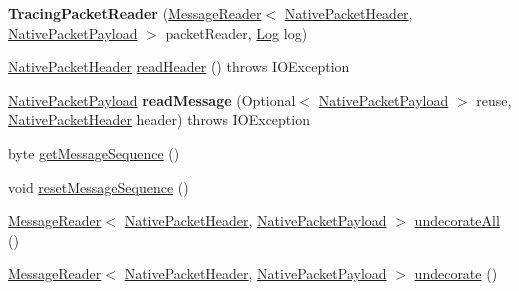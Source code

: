 \begin{DoxyCompactItemize}
\item 
\mbox{\label{classcom_1_1mysql_1_1cj_1_1protocol_1_1a_1_1_tracing_packet_reader_a5a10a043137ff4dd4c39577d98013861}} 
{\bfseries Tracing\+Packet\+Reader} (\mbox{\hyperlink{interfacecom_1_1mysql_1_1cj_1_1protocol_1_1_message_reader}{Message\+Reader}}$<$ \mbox{\hyperlink{classcom_1_1mysql_1_1cj_1_1protocol_1_1a_1_1_native_packet_header}{Native\+Packet\+Header}}, \mbox{\hyperlink{classcom_1_1mysql_1_1cj_1_1protocol_1_1a_1_1_native_packet_payload}{Native\+Packet\+Payload}} $>$ packet\+Reader, \mbox{\hyperlink{interfacecom_1_1mysql_1_1cj_1_1log_1_1_log}{Log}} log)
\item 
\mbox{\hyperlink{classcom_1_1mysql_1_1cj_1_1protocol_1_1a_1_1_native_packet_header}{Native\+Packet\+Header}} \mbox{\hyperlink{classcom_1_1mysql_1_1cj_1_1protocol_1_1a_1_1_tracing_packet_reader_a67550eb953a1d19c2ea8663e2336e2a3}{read\+Header}} ()  throws I\+O\+Exception 
\item 
\mbox{\label{classcom_1_1mysql_1_1cj_1_1protocol_1_1a_1_1_tracing_packet_reader_aff5267e4134fe6e81a0122eb5e2d2455}} 
\mbox{\hyperlink{classcom_1_1mysql_1_1cj_1_1protocol_1_1a_1_1_native_packet_payload}{Native\+Packet\+Payload}} {\bfseries read\+Message} (Optional$<$ \mbox{\hyperlink{classcom_1_1mysql_1_1cj_1_1protocol_1_1a_1_1_native_packet_payload}{Native\+Packet\+Payload}} $>$ reuse, \mbox{\hyperlink{classcom_1_1mysql_1_1cj_1_1protocol_1_1a_1_1_native_packet_header}{Native\+Packet\+Header}} header)  throws I\+O\+Exception 
\item 
byte \mbox{\hyperlink{classcom_1_1mysql_1_1cj_1_1protocol_1_1a_1_1_tracing_packet_reader_a35edadc0834493cc9536aa1c624c13ac}{get\+Message\+Sequence}} ()
\item 
void \mbox{\hyperlink{classcom_1_1mysql_1_1cj_1_1protocol_1_1a_1_1_tracing_packet_reader_a750a22688863ef18d02baaccd7f8475d}{reset\+Message\+Sequence}} ()
\item 
\mbox{\hyperlink{interfacecom_1_1mysql_1_1cj_1_1protocol_1_1_message_reader}{Message\+Reader}}$<$ \mbox{\hyperlink{classcom_1_1mysql_1_1cj_1_1protocol_1_1a_1_1_native_packet_header}{Native\+Packet\+Header}}, \mbox{\hyperlink{classcom_1_1mysql_1_1cj_1_1protocol_1_1a_1_1_native_packet_payload}{Native\+Packet\+Payload}} $>$ \mbox{\hyperlink{classcom_1_1mysql_1_1cj_1_1protocol_1_1a_1_1_tracing_packet_reader_a92981daf5c4331ba841e31d90d6b43ed}{undecorate\+All}} ()
\item 
\mbox{\hyperlink{interfacecom_1_1mysql_1_1cj_1_1protocol_1_1_message_reader}{Message\+Reader}}$<$ \mbox{\hyperlink{classcom_1_1mysql_1_1cj_1_1protocol_1_1a_1_1_native_packet_header}{Native\+Packet\+Header}}, \mbox{\hyperlink{classcom_1_1mysql_1_1cj_1_1protocol_1_1a_1_1_native_packet_payload}{Native\+Packet\+Payload}} $>$ \mbox{\hyperlink{classcom_1_1mysql_1_1cj_1_1protocol_1_1a_1_1_tracing_packet_reader_a5fab05e4e4ab55adf0f0755d7ca6513d}{undecorate}} ()
\end{DoxyCompactItemize}


